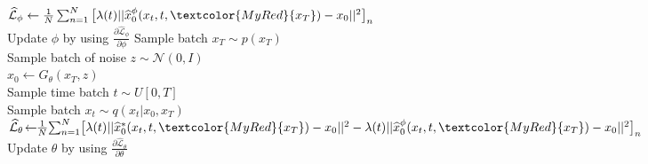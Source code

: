 \begin{algorithm}[h]
{{            $\widehat{\mathcal{L}}_{\phi} \leftarrow \frac{1}{N}\sum_{n=1}^N \big[\lambda(t)||\widehat{x}_0^{\phi}(x_t, t, \textcolor{MyRed}{x_T}) - x_0||^2\big]_{n}$ \\
            Update $\phi$ by using $\frac{\partial \widehat{\mathcal{L}}_{\phi}}{\partial \phi}$
        }
        Sample batch $x_T \sim p(x_T)$ \\
        Sample batch of noise $z \sim \mathcal{N}(0, I)$ \\
        $x_0 \leftarrow G_{\theta}(x_T, z)$ \\
        Sample time batch $t \sim U[0, T]$ \\
        Sample batch $x_t \sim q(x_t|x_0, x_T)$ \\
        $\widehat{\mathcal{L}}_{\theta} \! \leftarrow \!\! \frac{1}{N}\! \sum_{n=1}^N \! \big[\lambda(t)||\widehat{x}_0^{*}(x_t, t, \textcolor{MyRed}{x_T}) -  x_0||^2 - \\ 
        \lambda(t)||\widehat{x}_0^{\phi}(x_t, t, \textcolor{MyRed}{x_T})  - x_0||^2 \big]_{n}$ \\
        Update $\theta$ by using $\frac{\partial \widehat{\mathcal{L}}_{\theta}}{\partial \theta}$
    }
\end{algorithm}

\vspace{-2mm}